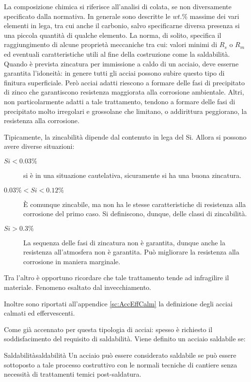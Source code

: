 La composizione chimica si riferisce all'analisi di colata, se non diversamente specificato dalla normativa.
In generale sono descritte le $wt.\%$ massime dei vari elementi in lega, tra cui anche il carbonio, salvo specificarne diversa presenza si una piccola quantità di qualche elemento.
La norma, di solito, specifica il raggiungimento di alcune proprietà meccaniche tra cui: valori minimi di $R_s$ o $R_m$ ed eventuali caratteristiche utili al fine della costruzione come la saldabilità.
Quando è prevista zincatura per immissione a caldo di un acciaio, deve esserne garantita l'idoneità: in genere tutti gli acciai possono subire questo tipo di finitura superficiale. Però acciai adatti riescono a formare delle fasi di precipitato di zinco che garantiscono resistenza maggiorata alla corrosione ambientale. Altri, non particolarmente adatti a tale trattamento, tendono a formare delle fasi di precipitato molto irregolari e grossolane che limitano, o addirittura peggiorano, la resistenza alla corrosione.

Tipicamente, la zincabilità dipende dal contenuto in lega del Si.
Allora si possono avere diverse situazioni:
\begin{description}
\item[$Si<0.03\%$] si è in una situazione cautelativa, sicuramente si ha una buona zincatura.
\item[$0.03\%<Si<0.12\%$] È comunque zincabile, ma non ha le stesse caratteristiche di resistenza alla corrosione del primo caso. Si definiscono, dunque, delle classi di zincabilità.
\item[$Si>0.3\%$] La sequenza delle fasi di zincatura non è garantita, dunque anche la resistenza all'atmosfera non è garantita. Può migliorare la resistenza alla corrosione in maniera marginale.
\end{description}
Tra l'altro è opportuno ricordare che tale trattamento tende ad infragilire il materiale. Fenomeno esaltato dal invecchiamento.

Inoltre sono riportati all'appendice \ref{sc:AccEffCalm} la definizione degli acciai calmati ed effervescenti.

Come già accennato per questa tipologia di acciai: spesso è richiesto il soddisfacimento del requisito di saldabilità.
Viene definito un acciaio saldabile se: 

\begin{definition}{Saldabilità}{saldabilità}
Un acciaio può essere considerato saldabile se può essere sottoposto a tale processo costruttivo con le normali tecniche di cantiere senza necessità di trattamenti temici post-saldatura. 
\end{definition}

